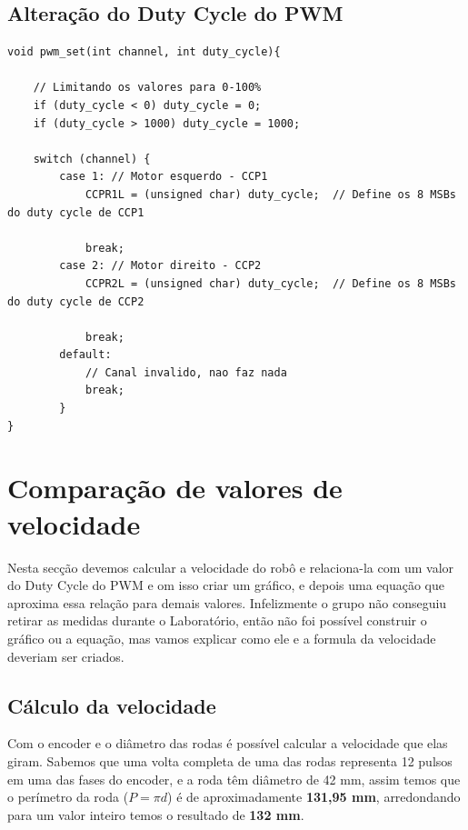 \documentclass{article}
\begin{document}
\subsection{Alteração do Duty Cycle do PWM}
\begin{lstlisting}[style = Matlab-editor, language = C2]
void pwm_set(int channel, int duty_cycle){
    
    // Limitando os valores para 0-100%
    if (duty_cycle < 0) duty_cycle = 0;
    if (duty_cycle > 1000) duty_cycle = 1000;
  
    switch (channel) {
        case 1: // Motor esquerdo - CCP1
            CCPR1L = (unsigned char) duty_cycle;  // Define os 8 MSBs do duty cycle de CCP1                     
            
            break;
        case 2: // Motor direito - CCP2
            CCPR2L = (unsigned char) duty_cycle;  // Define os 8 MSBs do duty cycle de CCP2  
            
            break;
        default:
            // Canal invalido, nao faz nada
            break;
        }
}
\end{lstlisting}
\section{Comparação de valores de velocidade}
Nesta secção devemos calcular a velocidade do robô e relaciona-la com um valor do Duty Cycle do PWM e om isso criar um gráfico, e depois uma equação que aproxima essa relação para demais valores.
Infelizmente o grupo não conseguiu retirar as medidas durante o Laboratório, então não foi possível construir o gráfico ou a equação, mas vamos explicar como ele e a formula da velocidade deveriam ser criados.\par

\subsection{Cálculo da velocidade}
Com o encoder e o diâmetro das rodas é possível calcular a velocidade que elas giram. Sabemos que uma volta completa de uma das rodas representa 12 pulsos em uma das fases do encoder, e a roda têm diâmetro de 42 mm, assim temos que o perímetro da roda ($P = \pi d $) é de aproximadamente \textbf{131,95 mm}, arredondando para um valor inteiro temos o resultado de \textbf{132 mm}.\par
\end{document}
